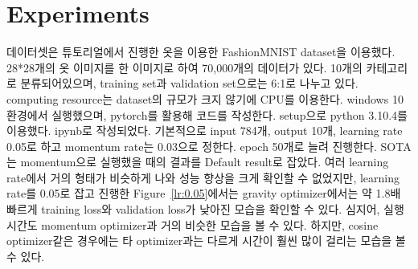 \documentclass{article}
\begin{document}
\section{Experiments}
데이터셋은 튜토리얼에서 진행한 옷을 이용한 FashionMNIST dataset을 이용했다. 28*28개의 옷 이미지를 한 이미지로 하여 70,000개의 데이터가 있다. 10개의 카테고리로 분류되어있으며, training set과 validation set으로는 6:1로 나누고 있다.
computing resource는 dataset의 규모가 크지 않기에 CPU를 이용한다. windows 10 환경에서 실행했으며, pytorch를 활용해 코드를 작성한다.
setup으로 python 3.10.4를 이용했다. ipynb로 작성되었다. 기본적으로 input 784개, output 10개, learning rate 0.05로 하고 momentum rate는 0.03으로 정한다. epoch 50개로 늘려 진행한다.
SOTA는 momentum으로 실행했을 때의 결과를 Default result로 잡았다. 여러 learning rate에서 거의 형태가 비슷하게 나와 성능 향상을 크게 확인할 수 없었지만, learning rate를 0.05로 잡고 진행한 Figure~\ref{lr:0.05}에서는 gravity optimizer에서는 약 1.8배 빠르게 training loss와 validation loss가 낮아진 모습을 확인할 수 있다. 심지어, 실행시간도 momentum optimizer과 거의 비슷한 모습을 볼 수 있다. 하지만, cosine optimizer같은 경우에는 타 optimizer과는 다르게 시간이 훨씬 많이 걸리는 모습을 볼 수 있다.
\end{document}
